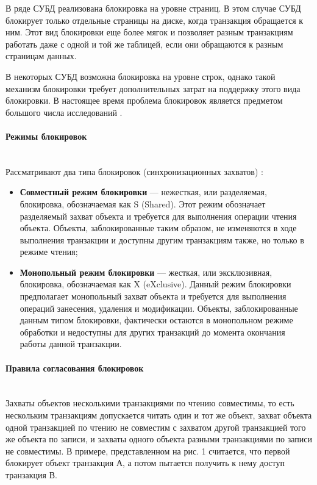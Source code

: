 В ряде СУБД реализована блокировка на уровне страниц. В этом случае СУБД блокирует только отдельные страницы на диске, когда транзакция обращается к ним. Этот вид блокировки еще более мягок и позволяет разным транзакциям работать даже с одной и той же таблицей, если они обращаются к разным страницам данных.


В некоторых СУБД возможна блокировка на уровне строк, однако такой механизм блокировки требует дополнительных затрат на поддержку этого вида блокировки. В настоящее время проблема блокировок является предметом большого числа исследований \autocite{Intuit}.

\paragraph{Режимы блокировок} ~\\

Рассматривают два типа блокировок (синхронизационных захватов) \autocite{Intuit}:

\begin{itemize}
    \item 
        \textbf{Совместный режим блокировки} — нежесткая, или разделяемая, блокировка, обозначаемая как S (Shared). Этот режим обозначает разделяемый захват объекта и требуется для выполнения операции чтения объекта. Объекты, заблокированные таким образом, не изменяются в ходе выполнения транзакции и доступны другим транзакциям также, но только в режиме чтения;
    \item 
        \textbf{Монопольный режим блокировки} — жесткая, или эксклюзивная, блокировка, обозначаемая как X (eXclusive). Данный режим блокировки предполагает монопольный захват объекта и требуется для выполнения операций занесения, удаления и модификации. Объекты, заблокированные данным типом блокировки, фактически остаются в монопольном режиме обработки и недоступны для других транзакций до момента окончания работы данной транзакции.
\end{itemize}

\paragraph{Правила согласования блокировок}~\\

Захваты объектов несколькими транзакциями по чтению совместимы, то есть нескольким транзакциям допускается читать один и тот же объект, захват объекта одной транзакцией по чтению не совместим с захватом другой транзакцией того же объекта по записи, и захваты одного объекта разными транзакциями по записи не совместимы. В примере, представленном на рис. 1 считается, что первой блокирует объект транзакция А, а потом пытается получить к нему доступ транзакция В.


